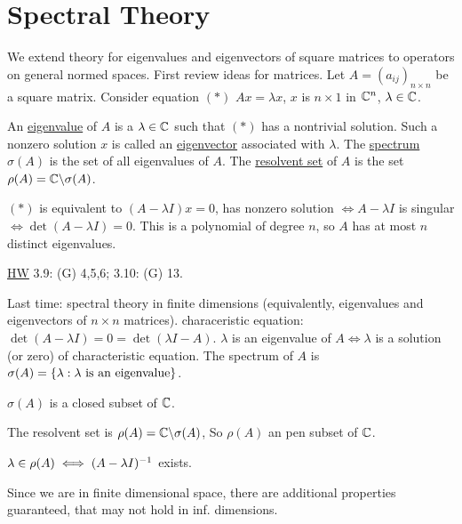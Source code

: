 \documentclass[]{article}
\begin{document}
\section*{Spectral Theory}
We extend theory for eigenvalues and eigenvectors of square matrices to operators on general normed spaces.
First review ideas for matrices. Let $A=(a_{ij})_{n\times n}$ be a square matrix.
Consider equation $(*)$ $Ax = \lambda x$, $x$ is $n\times 1$ in $\mathbb{C}^n$, $\lambda\in\mathbb{C}$.
\begin{definition}
	An \ul{eigenvalue} of $A$ is a $\lambda\in\mathbb{C}$ such that $(*)$ has a nontrivial solution.
	Such a nonzero solution $x$ is called an \ul{eigenvector} associated with $\lambda$.
	The \ul{spectrum} $\sigma(A)$ is the set of all eigenvalues of $A$.
	The \ul{resolvent set} of $A$ is the set $\rho(A)=\mathbb{C}\backslash\sigma(A)$.
\end{definition}
\begin{note}
	$(*)$ is equivalent to $(A-\lambda I)x=0$,
	has nonzero solution $\iff A-\lambda I$ is singular $\iff \det(A-\lambda I)=0$.
	This is a polynomial of degree $n$, so $A$ has at most $n$ distinct eigenvalues.
\end{note}

\ul{HW} 3.9: (G) 4,5,6; 3.10: (G) 13.

Last time: spectral theory in finite dimensions (equivalently, eigenvalues and eigenvectors of $n\times n$ matrices).
characeristic equation: $\det(A-\lambda I) = 0 = \det(\lambda I-A)$.
$\lambda$ is an eigenvalue of $A \iff \lambda$ is a solution (or zero) of characteristic equation.
The spectrum of $A$ is $\sigma(A) = \left\{ \lambda : \lambda\text{ is an eigenvalue} \right\}$.
\begin{note}
	$\sigma(A)$ is a closed subset of $\mathbb{C}$.
\end{note}
The resolvent set is $\rho(A)= \mathbb{C}\backslash\sigma(A)$, So $\rho(A)$ an pen subset of $\mathbb{C}$.
\begin{note}
	$\lambda\in\rho(A)\iff (A-\lambda I)^{-1}$ exists.
\end{note}
Since we are in finite dimensional space, there are additional properties guaranteed, that may not hold in inf. dimensions.
\end{document}
